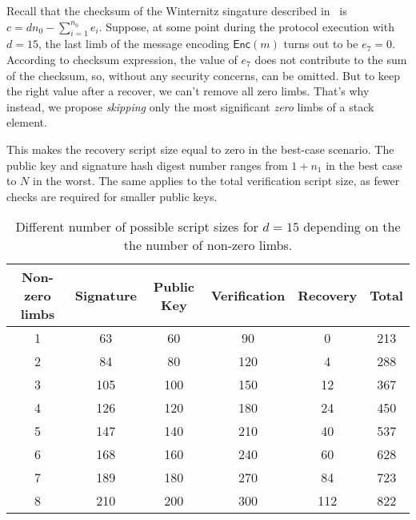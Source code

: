 \documentclass{iacrtrans}
\begin{document}
Recall that the checksum of the Winternitz singature described
in~\cite{applied-crypto} is $c = d n_0 - \sum_{i=1}^{n_0}e_i$. Suppose, at some
point during the protocol execution with $d=15$, the last limb of the message
encoding $\mathsf{Enc}(m)$ turns out to be $e_{7} = 0$. According to
checksum expression, the value of $e_{7}$ does not contribute to the
sum of the checksum, so, without any security concerns, can be omitted. But to
keep the right value after a recover, we can't remove all zero limbs. That's why
instead, we propose \textit{skipping} only the most significant \textit{zero}
limbs of a stack element.

This makes the recovery script size equal to zero in the best-case
scenario. The public key and signature hash digest number ranges from
$1 + n_1$ in the best case to $N$ in the worst. The same applies to
the total verification script size, as fewer checks are required for
smaller public keys.

\iffalse{}
\begin{verbatim}
import math
l = 32
d = 15
w = math.ceil(math.log(d+1, 2))
n0 = math.ceil(l / w)
n1 = math.ceil((2**w * n0).bit_length() / w)

for z in range(1, 8+1):
    k = z + n1

    pk_size = 20 * k
    ver_size = 2 * d * k
    sig_size = 21*k
    rec_size = 0
    for i in range(0, z):
        rec_size += int(i * w)

    total = pk_size + ver_size + rec_size + sig_size

    print(f"{z} & {sig_size} & {pk_size} & {ver_size} & {rec_size} & {total} \\\\")
\end{verbatim}
\fi
\begin{table}[H]
  \centering
  \begin{tabular}{cccccc}
    \toprule
    \textbf{Non-zero limbs} & \textbf{Signature} & \textbf{Public
    Key} & \textbf{Verification} & \textbf{Recovery} & \textbf{Total} \\
    \midrule
    1 & 63 & 60 & 90 & 0 & 213 \\
    2 & 84 & 80 & 120 & 4 & 288 \\
    3 & 105 & 100 & 150 & 12 & 367 \\
    4 & 126 & 120 & 180 & 24 & 450 \\
    5 & 147 & 140 & 210 & 40 & 537 \\
    6 & 168 & 160 & 240 & 60 & 628 \\
    7 & 189 & 180 & 270 & 84 & 723 \\
    8 & 210 & 200 & 300 & 112 & 822 \\
    \bottomrule
  \end{tabular}
  \caption{Different number of possible script sizes for $d = 15$
    depending on the the number of non-zero
  limbs.}\label{tab:winternitz-script-size}
\end{table}
\end{document}

